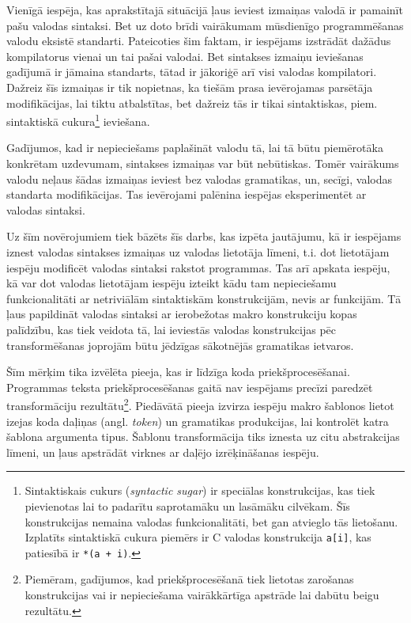 Vienīgā iespēja, kas aprakstītajā situācijā ļaus ieviest izmaiņas valodā ir pamainīt pašu valodas sintaksi. Bet uz doto brīdi vairākumam mūsdienīgo programmēšanas valodu eksistē standarti. Pateicoties šim faktam, ir iespējams izstrādāt dažādus kompilatorus vienai un tai pašai valodai. Bet sintakses izmaiņu ieviešanas gadījumā ir jāmaina standarts, tātad ir jākoriģē arī visi valodas kompilatori. Dažreiz šīs izmaiņas ir tik nopietnas, ka tiešām prasa ievērojamas parsētāja modifikācijas, lai tiktu atbalstītas, bet dažreiz tās ir tikai sintaktiskas, piem. sintaktiskā cukura\footnote{Sintaktiskais cukurs (\emph{syntactic sugar}) ir speciālas konstrukcijas, kas tiek pievienotas lai to padarītu saprotamāku un lasāmāku cilvēkam. Šīs konstrukcijas nemaina valodas funkcionalitāti, bet gan atvieglo tās lietošanu. Izplatīts sintaktiskā cukura piemērs ir C valodas konstrukcija \texttt{a[i]}, kas patiesībā ir \texttt{*(a + i)}.} ieviešana.

Gadījumos, kad ir nepieciešams paplašināt valodu tā, lai tā būtu piemērotāka konkrētam uzdevumam, sintakses izmaiņas var būt nebūtiskas. Tomēr vairākums valodu neļaus šādas izmaiņas ieviest bez valodas gramatikas, un, secīgi, valodas standarta modifikācijas. Tas ievērojami palēnina iespējas eksperimentēt ar valodas sintaksi.

Uz šīm novērojumiem tiek bāzēts šīs darbs, kas izpēta jautājumu, kā ir iespējams iznest valodas sintakses izmaiņas uz valodas lietotāja līmeni, t.i. dot lietotājam iespēju modificēt valodas sintaksi rakstot programmas. Tas arī apskata iespēju, kā var dot valodas lietotājam iespēju izteikt kādu tam nepieciešamu funkcionalitāti ar netriviālām sintaktiskām konstrukcijām, nevis ar funkcijām. Tā ļaus papildināt valodas sintaksi ar ierobežotas makro konstrukciju kopas palīdzību, kas tiek veidota tā, lai ieviestās valodas konstrukcijas pēc transformēšanas joprojām būtu jēdzīgas sākotnējās gramatikas ietvaros.

Šīm mērķim tika izvēlēta pieeja, kas ir līdzīga koda priekšprocesēšanai. Programmas teksta priekšprocesēšanas gaitā nav iespējams precīzi paredzēt transformāciju rezultātu\footnote{Piemēram, gadījumos, kad priekšprocesēšanā tiek lietotas zarošanas konstrukcijas vai ir nepieciešama vairākkārtīga apstrāde lai dabūtu beigu rezultātu.}. Piedāvātā pieeja izvirza iespēju makro šablonos lietot izejas koda daļiņas (angl. \emph{token}) un gramatikas produkcijas, lai kontrolēt katra šablona argumenta tipus. Šablonu transformācija tiks iznesta uz citu abstrakcijas līmeni, un ļaus apstrādāt virknes ar daļējo izrēķināšanas iespēju.

